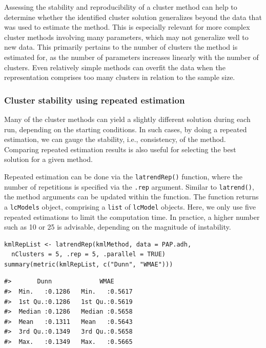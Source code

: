 Assessing the stability and reproducibility of a cluster method can help to determine whether the identified cluster solution generalizes beyond the data that was used to estimate the method. This is especially relevant for more complex cluster methods involving many parameters, which may not generalize well to new data. This primarily pertains to the number of clusters the method is estimated for, as the number of parameters increases linearly with the number of clusters. Even relatively simple methods can overfit the data when the representation comprises too many clusters in relation to the sample size.

\subsubsection{Cluster stability using repeated estimation}\label{cluster-stability-using-repeated-estimation}

Many of the cluster methods can yield a slightly different solution during each run, depending on the starting conditions. In such cases, by doing a repeated estimation, we can gauge the stability, i.e., consistency, of the method. Comparing repeated estimation results is also useful for selecting the best solution for a given method.

Repeated estimation can be done via the \texttt{latrendRep()} function, where the number of repetitions is specified via the \texttt{.rep} argument. Similar to \texttt{latrend()}, the method arguments can be updated within the function. The function returns a \texttt{lcModels} object, comprising a \texttt{list} of \texttt{lcModel} objects. Here, we only use five repeated estimations to limit the computation time. In practice, a higher number such as 10 or 25 is advisable, depending on the magnitude of instability.

\begin{verbatim}
kmlRepList <- latrendRep(kmlMethod, data = PAP.adh,
  nClusters = 5, .rep = 5, .parallel = TRUE)
summary(metric(kmlRepList, c("Dunn", "WMAE")))
\end{verbatim}

\begin{verbatim}
#>       Dunn             WMAE       
#>  Min.   :0.1286   Min.   :0.5617  
#>  1st Qu.:0.1286   1st Qu.:0.5619  
#>  Median :0.1286   Median :0.5658  
#>  Mean   :0.1311   Mean   :0.5643  
#>  3rd Qu.:0.1349   3rd Qu.:0.5658  
#>  Max.   :0.1349   Max.   :0.5665
\end{verbatim}

